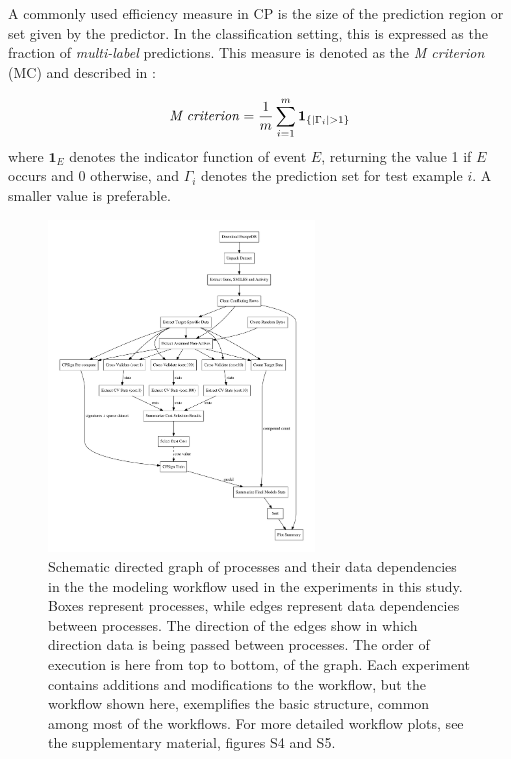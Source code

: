 \documentclass[10pt,article]{memoir}
\begin{document}
A commonly used efficiency measure in CP is the size of the prediction region or set 
given by the predictor. In the classification setting, this is expressed as the fraction of
\textit{multi-label} predictions. This measure is denoted as the \textit{M criterion} (MC) and described
in \cite{Vovk2016}:

\begin{equation}
\text{\textit{M criterion}} = \frac{ 1}{m} \sum\limits_{i=1}^{m}  \boldsymbol{1}_{\{|\Gamma_i|>1\}}	
\end{equation}
where $\boldsymbol{1}_E$ denotes the indicator function of event $E$, returning the 
value 1 if $E$ occurs and 0 otherwise, and $\Gamma_i$ denotes the prediction set 
for test example $i$.  A smaller value is preferable. 



\begin{figure}[h!]
\begin{center}
\includegraphics[width=0.63\textwidth]{figures/fig1_schematic_workflow.pdf}
    \caption{Schematic directed graph of processes and their data
    dependencies in the the modeling workflow used in the experiments in this
    study. Boxes represent processes, while edges represent data dependencies
    between processes. The direction of the edges show in which direction
    data is being passed between processes. The order of execution is here
    from top to bottom, of the graph. Each experiment contains additions and
    modifications to the workflow, but the workflow shown here, exemplifies
    the basic structure, common among most of the workflows. For more
    detailed workflow plots, see the supplementary material, figures S4 and S5.}
    \label{fig:workflow_graph_clean}
\end{center}
\end{figure}
\end{document}
